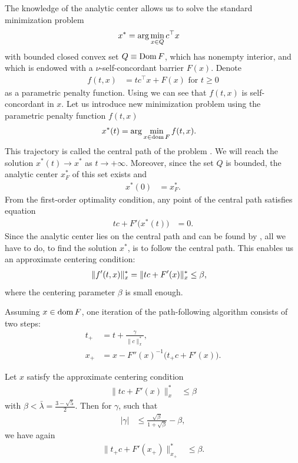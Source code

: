 The knowledge of the analytic center allows us to solve the standard minimization problem
\begin{align}
  x^* &= \arg\min_{x\in Q} c^\top x \labeleq{SDP:scb:standardProblem}
\end{align}
with bounded closed convex set $Q \equiv \operatorname{Dom} F$, which has nonempty interior, and which is endowed with a $\nu$-self-concordant barrier $F(x)$.
Denote
\begin{align}
  f(t,x) &= tc^\top x + F(x) \text{ for } t \geq 0
\end{align}
as a parametric penalty function.
Using  we can see that $f(t,x)$ is self-concordant in $x$.
Let us introduce new minimization problem using the parametric penalty function $f(t,x)$
\begin{align}
  x^*(t) &= \arg\min_{x\in\dom F} f(t,x).\labeleq{SDP:scb:centralPath}
\end{align}
This trajectory is called the central path of the problem .
We will reach the solution $x^*(t) \rightarrow x^*$ as $t \rightarrow +\infty$.
Moreover, since the set $Q$ is bounded, the analytic center $x^*_F$ of this set exists and
\begin{align}
  x^*(0) &= x^*_F.
\end{align}
From the first-order optimality condition, any point of the central path satisfies equation
\begin{align}
  tc + F'\big(x^*(t)\big) &= 0.
\end{align}
Since the analytic center lies on the central path and can be found by , all we have to do, to find the solution $x^*$, is to follow the central path. 
This enables us an approximate centering condition:
\begin{align}
  \|f'(t,x)\|^*_x = \|tc + F'(x)\|^*_x &\leq \beta, \labeleq{SDP:scb:cntrCondition}
\end{align}
where the centering parameter $\beta$ is small enough.

Assuming $x\in\operatorname{dom} F$, one iteration of the path-following algorithm consists of two steps:
\begin{align}
  t_+ &= t + \frac{\gamma}{\|c\|^*_x},\\
  x_+ &= x - F''(x)^{-1}\big(t_+c+F'(x)\big).
\end{align}

\begin{theorem}
  Let $x$ satisfy the approximate centering condition 
  \begin{align}
    \|tc + F'(x)\|^*_x &\leq \beta
  \end{align}
  with $\beta < \bar{\lambda} = \frac{3-\sqrt{5}}{2}$.
  Then for $\gamma$, such that
  \begin{align}
    |\gamma| &\leq \frac{\sqrt{\beta}}{1+\sqrt{\beta}} - \beta,
  \end{align}
  we have again
  \begin{align}
    \|t_+c + F'(x_+)\|^*_{x_+} &\leq \beta.
  \end{align}
\end{theorem}

